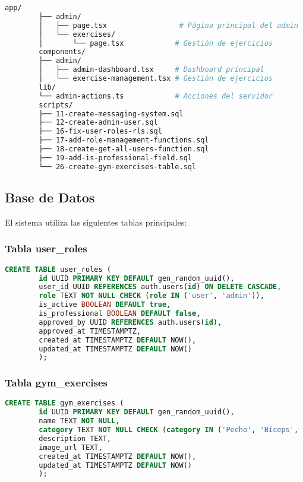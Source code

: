 \documentclass[12pt,a4paper]{article}
\begin{document}
	\begin{lstlisting}[language=bash, caption=Estructura del módulo de administrador]
		app/
		├── admin/
		│   ├── page.tsx                 # Página principal del admin
		│   └── exercises/
		│       └── page.tsx            # Gestión de ejercicios
		components/
		├── admin/
		│   ├── admin-dashboard.tsx     # Dashboard principal
		│   └── exercise-management.tsx # Gestión de ejercicios
		lib/
		└── admin-actions.ts            # Acciones del servidor
		scripts/
		├── 11-create-messaging-system.sql
		├── 12-create-admin-user.sql
		├── 16-fix-user-roles-rls.sql
		├── 17-add-role-management-functions.sql
		├── 18-create-get-all-users-function.sql
		├── 19-add-is-professional-field.sql
		└── 26-create-gym-exercises-table.sql
	\end{lstlisting}
	
	\subsection{Base de Datos}
	
	El sistema utiliza las siguientes tablas principales:
	
	\subsubsection{Tabla user\_roles}
	\begin{lstlisting}[language=SQL, caption=Estructura de la tabla user\_roles]
		CREATE TABLE user_roles (
		id UUID PRIMARY KEY DEFAULT gen_random_uuid(),
		user_id UUID REFERENCES auth.users(id) ON DELETE CASCADE,
		role TEXT NOT NULL CHECK (role IN ('user', 'admin')),
		is_active BOOLEAN DEFAULT true,
		is_professional BOOLEAN DEFAULT false,
		approved_by UUID REFERENCES auth.users(id),
		approved_at TIMESTAMPTZ,
		created_at TIMESTAMPTZ DEFAULT NOW(),
		updated_at TIMESTAMPTZ DEFAULT NOW()
		);
	\end{lstlisting}
	
	\subsubsection{Tabla gym\_exercises}
	\begin{lstlisting}[language=SQL, caption=Estructura de la tabla gym\_exercises]
		CREATE TABLE gym_exercises (
		id UUID PRIMARY KEY DEFAULT gen_random_uuid(),
		name TEXT NOT NULL,
		category TEXT NOT NULL CHECK (category IN ('Pecho', 'Bíceps', 'Tríceps', 'Hombros', 'Pierna', 'Espalda', 'Otros')),
		description TEXT,
		image_url TEXT,
		created_at TIMESTAMPTZ DEFAULT NOW(),
		updated_at TIMESTAMPTZ DEFAULT NOW()
		);
	\end{lstlisting}
	
\end{document}

